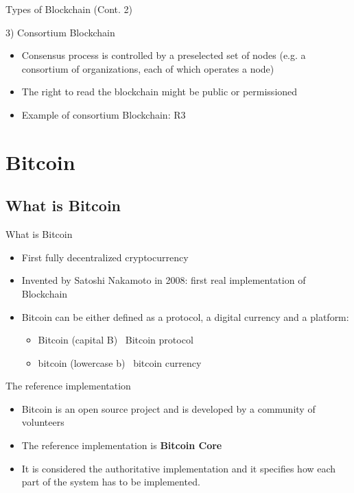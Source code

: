 \documentclass{beamer}
\begin{document}
  \begin{frame}{Types of Blockchain (Cont. 2)}
    \begin{block}{3) Consortium Blockchain}
      \begin{itemize}
        \item Consensus process is controlled by a preselected set of nodes (e.g. a consortium of organizations, each of which operates a node) 
        \item The right to read the blockchain might be public or permissioned 
        \item Example of consortium Blockchain: R3 \cite{R3}
      \end{itemize}
    \end{block}
  \end{frame}










  \section{Bitcoin}
  \subsection{What is Bitcoin}
  \begin{frame}{What is Bitcoin}
    \begin{itemize}
      \item First fully decentralized cryptocurrency 
      \item Invented by Satoshi Nakamoto in 2008: first real implementation of
      Blockchain 
      \item Bitcoin can be either defined as a protocol, a digital currency
      and a platform: 
      \begin{itemize}
        \item Bitcoin (capital B)  \MVRightarrow\, Bitcoin protocol
        \item bitcoin (lowercase b) \MVRightarrow\, bitcoin  currency
      \end{itemize} \pause
    \end{itemize}

    \begin{block}{The reference implementation}
      \begin{itemize}
        \item Bitcoin is an open source project and is developed by a community of volunteers
        \item The reference implementation is \textbf{Bitcoin Core}
        \item It is considered the authoritative implementation and it specifies
        how each part of the system has to be implemented.
      \end{itemize}
    \end{block}
  \end{frame}
\end{document}

